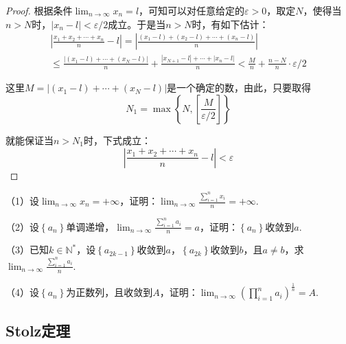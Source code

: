 \begin{proof}

根据条件\(\lim_{n \to \infty} x_{n} = l\)，可知可以对任意给定的\(\varepsilon > 0\)，取定\(N\)，使得当\(n > N\)时，\(\left| x_{n} - l \right| < \varepsilon / 2\)成立。于是当\(n > N\)时，有如下估计：
\begin{multline}
    \left| \frac{x_{1} + x_{2} + \cdots + x_{n}}{n} - l \right| = \left| \frac{\left( x_{1} - l \right) + \left( x_{2} - l \right) + \cdots + \left( x_{n} - l \right)}{n} \right| \\
    \le \frac{\left| \left( x_{1} - l \right) + \cdots + \left( x_{N} - l \right) \right|}{n} + \frac{\left| x_{N + 1} - l \right| + \cdots + \left| x_{n} - l \right|}{n} < \frac{M}{n} + \frac{n - N}{n} \cdot \varepsilon / 2
\end{multline}

这里\(M = \left| \left( x_{1} - l \right) + \cdots + \left( x_{N} - l \right) \right|\)是一个确定的数，由此，只要取得
\begin{equation}
    N_{1} = \max \left\{ N , \left[ \frac{M}{\varepsilon / 2} \right] \right\}
\end{equation}

就能保证当\(n > N_{1}\)时，下式成立：
\begin{equation}
    \left| \frac{x_{1} + x_{2} + \cdots + x_{n}}{n} - l \right| < \varepsilon
\end{equation}

\end{proof}

\begin{example}
    （1）设\(\lim_{n \to \infty} x_{n} = + \infty\)，证明：\(\lim_{n \to \infty} \frac{\sum _{i = 1}^{n} x_{i}}{n} = + \infty\).

    （2）设\(\left\{ a_{n} \right\}\)单调递增，\(\lim_{n \to \infty} \frac{\sum _{i = 1}^{n} a_{i}}{n} = a\)，证明：\(\left\{ a_{n} \right\}\)收敛到\(a\).

    （3）已知\(k \in \mathbb{N}^{*}\)，设\(\left\{ a_{2 k - 1} \right\}\)收敛到\(a\)，\(\left\{ a_{2 k} \right\}\)收敛到\(b\)，且\(a \ne b\)，求\(\lim_{n \to \infty} \frac{\sum _{i = 1}^{n} a_{i}}{n}\).

    （4）设\(\left\{ a_{n} \right\}\)为正数列，且收敛到\(A\)，证明：\(\lim_{n \to \infty} {\left( \prod _{i = 1}^{n} a_{i} \right)}^{\frac{1}{n}} = A\).
\end{example}

\subsection{Stolz定理}
